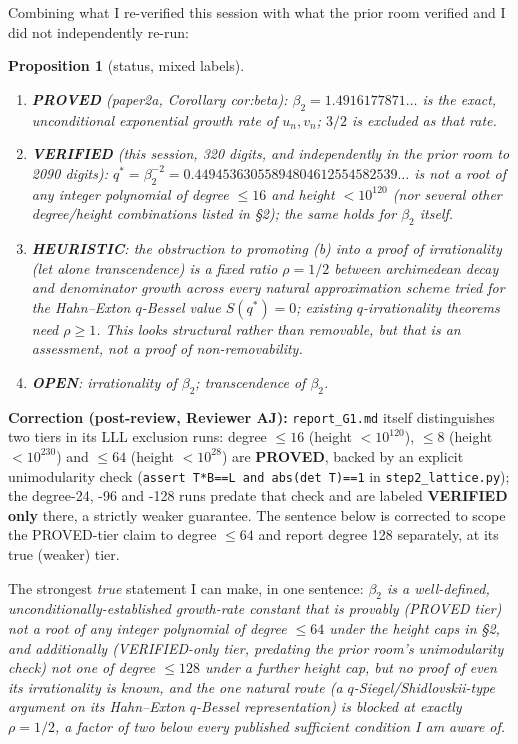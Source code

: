 \documentclass[11pt]{article}
\newtheorem{proposition}{Proposition}
\begin{document}
Combining what I re-verified this session with what the prior room verified and I did not
independently re-run:

\begin{proposition}[status, mixed labels]
\begin{enumerate}
\item[(a)] \textbf{PROVED} (paper2a, Corollary cor:beta): $\beta_2=1.4916177871\ldots$ is the
exact, unconditional exponential growth rate of $u_n,v_n$; $3/2$ is excluded as that rate.
\item[(b)] \textbf{VERIFIED} (this session, 320 digits, and independently in the prior room to
2090 digits): $q^\ast=\beta_2^{-2}=0.44945363055894804612554582539\ldots$ is not a root of any
integer polynomial of degree $\le16$ and height $<10^{120}$ (nor several other degree/height
combinations listed in \S2); the same holds for $\beta_2$ itself.
\item[(c)] \textbf{HEURISTIC}: the obstruction to promoting (b) into a proof of irrationality
(let alone transcendence) is a fixed ratio $\rho=1/2$ between archimedean decay and denominator
growth across every natural approximation scheme tried for the Hahn--Exton $q$-Bessel value
$S(q^\ast)=0$; existing $q$-irrationality theorems need $\rho\ge1$. This looks structural rather
than removable, but that is an assessment, not a proof of non-removability.
\item[(d)] \textbf{OPEN}: irrationality of $\beta_2$; transcendence of $\beta_2$.
\end{enumerate}
\end{proposition}

\textbf{Correction (post-review, Reviewer AJ):} \texttt{report\_G1.md} itself distinguishes two
tiers in its LLL exclusion runs: degree $\le16$ (height $<10^{120}$), $\le8$ (height $<10^{230}$)
and $\le64$ (height $<10^{28}$) are \textbf{PROVED}, backed by an explicit unimodularity check
(\texttt{assert T*B==L and abs(det T)==1} in \texttt{step2\_lattice.py}); the degree-24, -96 and
-128 runs predate that check and are labeled \textbf{VERIFIED only} there, a strictly weaker
guarantee. The sentence below is corrected to scope the PROVED-tier claim to degree $\le64$ and
report degree 128 separately, at its true (weaker) tier.

The strongest \emph{true} statement I can make, in one sentence: \emph{$\beta_2$ is a
well-defined, unconditionally-established growth-rate constant that is provably (PROVED tier) not
a root of any integer polynomial of degree $\le64$ under the height caps in \S2, and additionally
(VERIFIED-only tier, predating the prior room's unimodularity check) not one of degree $\le128$
under a further height cap, but no proof of even its irrationality is known, and the one natural
route (a $q$-Siegel/Shidlovskii-type argument on its Hahn--Exton $q$-Bessel representation) is
blocked at exactly $\rho=1/2$, a factor of two below every published sufficient condition I am
aware of.}
\end{document}
